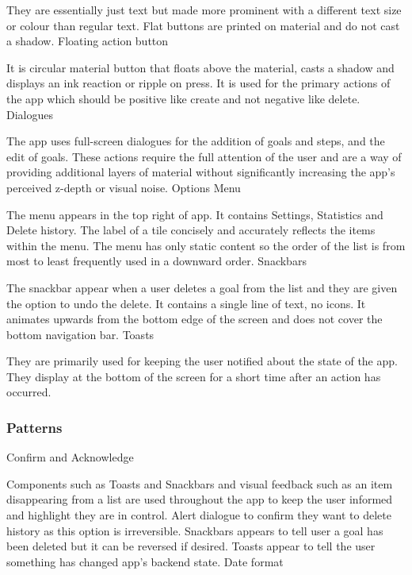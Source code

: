 \documentclass[12pt]{report}
\begin{document}
They are essentially just text but made more prominent with a different text size or colour than regular text. Flat buttons are printed on material and do not cast a shadow.
 \newline
 \newline
 Floating action button
 
It is circular material button that floats above the material, casts a shadow and displays an ink reaction or ripple on press. It is used for the primary actions of the app which should be positive like create and not negative like delete. 
 \newline
 \newline
Dialogues

The app uses full-screen dialogues for the addition of goals and steps, and the edit of goals. These actions require the full attention of the user and are a way of providing additional layers of material without significantly increasing the app’s perceived z-depth or visual noise.
 \newline
 \newline
Options Menu

The menu appears in the top right of app. It contains Settings, Statistics and Delete history. The label of a tile concisely and accurately reflects the items within the menu. The menu has only static content so the order of the list is from most to least frequently used in a downward order.
 \newline
 \newline
Snackbars

The snackbar appear when a user deletes a goal from the list and they are given the option to undo the delete. It contains a single line of text, no icons. It animates upwards from the bottom edge of the screen and does not cover the bottom navigation bar.
 \newline
 \newline
Toasts

They are primarily used for keeping the user notified about the state of the app. They display at the bottom of the screen for a short time after an action has occurred. 

\subsubsection{Patterns}

Confirm and Acknowledge

Components such as Toasts and Snackbars and visual feedback such as an item disappearing from a list are used throughout the app to keep the user informed and highlight they are in control.
Alert dialogue to confirm they want to delete history as this option is irreversible. 
Snackbars appears to tell user a goal has been deleted but it can be reversed if desired.
Toasts appear to tell the user something has changed app's backend state.
 \newline
 \newline
Date format 
\end{document}
